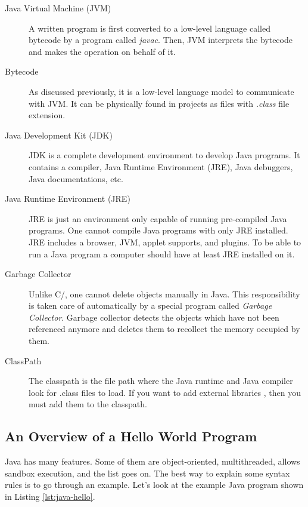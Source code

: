 \begin{description}
    \item[Java Virtual Machine (JVM)] A written program is first converted to a low-level language called bytecode by a program called \emph{javac}. Then, JVM interprets the bytecode and makes the operation on behalf of it.
    
    \item[Bytecode] As discussed previously, it is a low-level language model to communicate with JVM. It can be physically found in projects as files with \emph{.class} file extension.
    
    \item[Java Development Kit (JDK)] JDK is a complete development environment to develop Java programs. It contains a compiler, Java Runtime Environment (JRE), Java debuggers, Java documentations, etc.
    
    \item[Java Runtime Environment (JRE)] JRE is just an environment only capable of running pre-compiled Java programs. One cannot compile Java programs with only JRE installed. JRE includes a browser, JVM, applet supports, and plugins. To be able to run a Java program a computer should have at least JRE installed on it.
    
    \item[Garbage Collector] Unlike C/\CC, one cannot delete objects manually in Java. This responsibility is taken care of automatically by a special program called \emph{Garbage Collector}. Garbage collector detects the objects which have not been referenced anymore and deletes them to recollect the memory occupied by them.
    
    \item[ClassPath] The classpath is the file path where the Java runtime and Java compiler look for .class files to load. If you want to add external libraries , then you must add them to the classpath.
\end{description}

\subsection{An Overview of a Hello World Program}
Java has many features. Some of them are object-oriented, multithreaded, allows sandbox execution, and the list goes on. The best way to explain some syntax rules is to go through an example. Let's look at the example Java program shown in Listing \ref{lst:java-hello}.

